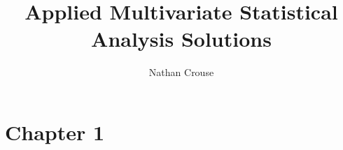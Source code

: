 \documentclass{article}
\begin{document}
\title{Applied Multivariate Statistical Analysis Solutions}
\author{Nathan Crouse}
\maketitle

\tableofcontents

\section{Chapter 1}

%     
%     
%     

\subsection{}
%
% 
% 
% 
% 
% 
% 

\end{document}
